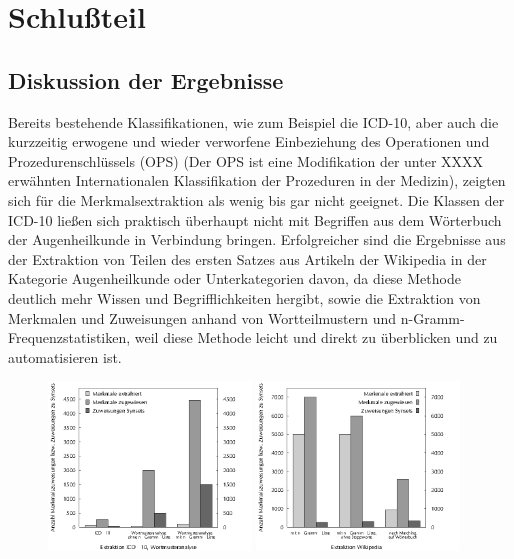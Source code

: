 \documentclass[pagesize,DIV=calc,12pt,draft]{scrreprt}
\begin{document}
\chapter{Schlußteil}

\section{Diskussion der Ergebnisse}

Bereits bestehende Klassifikationen, wie zum Beispiel die ICD-10, aber auch die kurzzeitig erwogene und wieder verworfene Einbeziehung des Operationen und Prozedurenschlüssels (OPS) (Der OPS ist eine Modifikation der unter XXXX erwähnten Internationalen Klassifikation der Prozeduren in der Medizin), zeigten sich für die Merkmalsextraktion als wenig bis gar nicht geeignet. 
Die Klassen der ICD-10 ließen sich praktisch überhaupt nicht mit Begriffen aus dem Wörterbuch der Augenheilkunde in Verbindung bringen. 
Erfolgreicher sind die Ergebnisse aus der Extraktion von Teilen des ersten Satzes aus Artikeln der Wikipedia in der Kategorie Augenheilkunde oder Unterkategorien davon, da diese Methode deutlich mehr Wissen und Begrifflichkeiten hergibt, sowie die Extraktion von Merkmalen und Zuweisungen anhand von Wortteilmustern und n-Gramm-Frequenzstatistiken, weil diese Methode leicht und direkt zu überblicken und zu automatisieren ist. 

\begin{figure}[!ht]
\includegraphics[width=0.48\textwidth]{icd10_affixe}
\hfill
\includegraphics[width=0.48\textwidth]{wiki_extraktion}
\end{figure}
\end{document}
